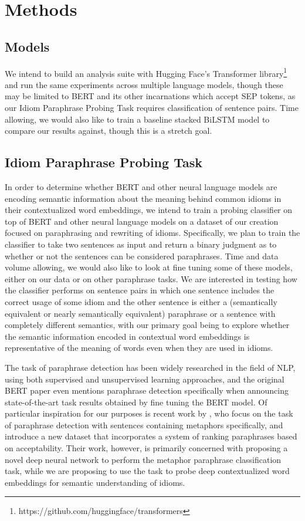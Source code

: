 \documentclass[11pt,a4paper]{article}
\begin{document}
\section{Methods}
\subsection{Models}
We intend to build an analysis suite with Hugging Face's Transformer library\footnote{https://github.com/huggingface/transformers} and run the same experiments across multiple language models, though these may be limited to BERT and its other incarnations which accept SEP tokens, as our Idiom Paraphrase Probing Task requires classification of sentence pairs. Time allowing, we would also like to train a baseline stacked BiLSTM model to compare our results against, though this is a stretch goal.
\subsection{Idiom Paraphrase Probing Task}
In order to determine whether BERT and other neural language models are encoding semantic information about the meaning behind common idioms in their contextualized word embeddings, we intend to train a probing classifier on top of BERT and other neural language models on a dataset of our creation focused on paraphrasing and rewriting of idioms. Specifically, we plan to train the classifier to take two sentences as input and return a binary judgment as to whether or not the sentences can be considered paraphrases. Time and data volume allowing, we would also like to look at fine tuning some of these models, either on our data or on other paraphrase tasks. We are interested in testing how the classifier performs on sentence pairs in which one sentence includes the correct usage of some idiom and the other sentence is either a (semantically equivalent or nearly semantically equivalent) paraphrase or a sentence with completely different semantics, with our primary goal being to explore whether the semantic information encoded in contextual word embeddings is representative of the meaning of words even when they are used in idioms. 

The task of paraphrase detection has been widely researched in the field of NLP, using both supervised and unsupervised learning approaches, and the original BERT paper \citep{devlin2018bert} even mentions paraphrase detection specifically when announcing state-of-the-art task results obtained by fine tuning the BERT model.
Of particular inspiration for our purposes is recent work by \citet{bizzoni-lappin-2018-predicting}, who focus on the task of paraphrase detection with sentences containing metaphors specifically, and introduce a new dataset that incorporates a system of ranking paraphrases based on acceptability. Their work, however, is primarily concerned with proposing a novel deep neural network to perform the metaphor paraphrase classification task, while we are proposing to use the task to probe deep contextualized word embeddings for semantic understanding of idioms. 
\end{document}
